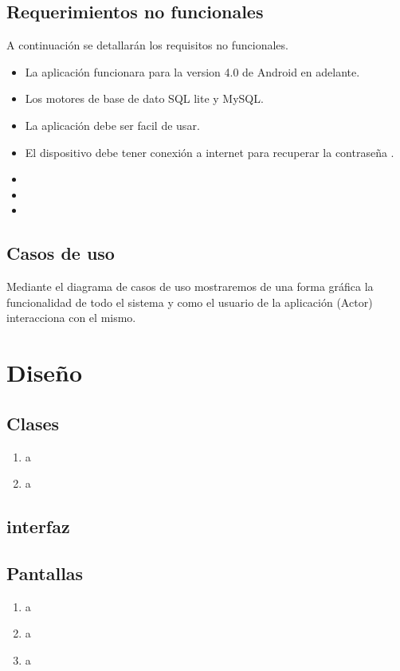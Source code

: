 \documentclass[letterpaper,12pt,openany,oneside]{book}
\begin{document}
\newpage
\subsection{Requerimientos no funcionales}
A continuación se detallarán los requisitos no funcionales.

\begin{itemize}
\item La aplicación funcionara para la version 4.0 de Android en adelante.
\item Los motores de base de dato SQL lite y MySQL.
\item La aplicación debe ser facil de usar.
\item  El dispositivo debe tener conexión a internet para recuperar la contraseña .
\item
\item
\item
\end{itemize}
\subsection{Casos de uso}
Mediante el diagrama de casos de uso mostraremos de una forma gráfica la
funcionalidad de todo el sistema y como el usuario de la aplicación (Actor) interacciona
con el mismo.

\section{Dise\~no}
\subsection{Clases}
\begin{enumerate}
\item a
\item a
\end{enumerate}
\subsection{interfaz}

\subsection{Pantallas}
\begin{enumerate}
\item a\item a
\item a
\end{enumerate}
\end{document}
